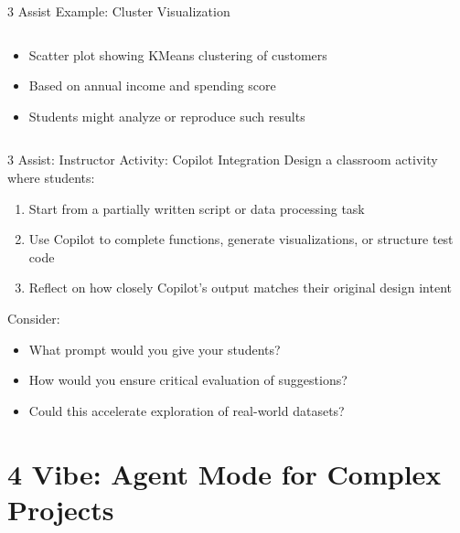 \documentclass[xcolor=dvipsnames, aspectratio=169]{beamer}
\newcommand{\footername}{AI in Programming Education}
\newcommand{\setfooter}[2]{\renewcommand{\footername}{\href{#2}{#1}}}
\begin{document}
\begin{frame}{3 Assist Example: Cluster Visualization}
\begin{columns}
\begin{column}{0.4\textwidth}
      \begin{itemize}
        \item Scatter plot showing KMeans clustering of customers
        \item Based on annual income and spending score
        \item Students might analyze or reproduce such results
      \end{itemize}
    \end{column}
  \end{columns}
\end{frame}


\begin{frame}{3 Assist: Instructor Activity: Copilot Integration}
  Design a classroom activity where students:
  \begin{enumerate}
    \item Start from a partially written script or data processing task
    \item Use Copilot to complete functions, generate visualizations, or structure test code
    \item Reflect on how closely Copilot's output matches their original design intent
  \end{enumerate}
  
  Consider:
  \begin{itemize}
    \item What prompt would you give your students?
    \item How would you ensure critical evaluation of suggestions?
    \item Could this accelerate exploration of real-world datasets?
  \end{itemize}
\end{frame}

\section{4 Vibe: Agent Mode for Complex Projects}
\setfooter{4 Vibe}{https://github.com/neu-ece-esl/ai-prog-workshop/tree/main/4-vibe}
\end{document}
